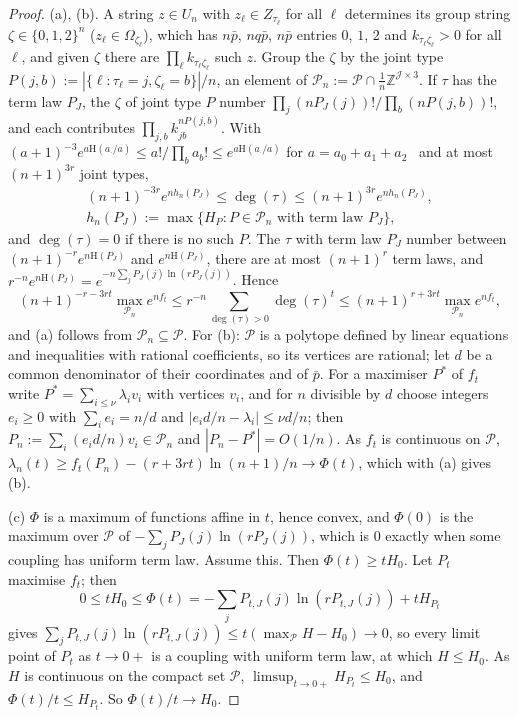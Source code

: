 \documentclass[11pt]{article}
\theoremstyle{definition}
\theoremstyle{remark}
\newcommand{\Z}{\mathbb{Z}}
\newcommand{\Hh}{\mathrm{H}}
\begin{document}
\begin{proof}
(a), (b). A string $z\in U_n$ with $z_\ell\in Z_{\tau_\ell}$ for all $\ell$ determines its group string $\zeta\in\{0,1,2\}^n$ ($z_\ell\in\Omega_{\zeta_\ell}$), which has $n\bar p$, $nq\bar p$, $n\bar p$ entries $0$, $1$, $2$ and $k_{\tau_\ell\zeta_\ell}>0$ for all $\ell$, and given $\zeta$ there are $\prod_\ell k_{\tau_\ell\zeta_\ell}$ such $z$. Group the $\zeta$ by the joint type $P(j,b):=|\{\ell:\tau_\ell=j,\zeta_\ell=b\}|/n$, an element of $\mathcal P_n:=\mathcal P\cap\frac1n\Z^{\mathcal J\times3}$. If $\tau$ has the term law $P_J$, the $\zeta$ of joint type $P$ number $\prod_j(nP_J(j))!/\prod_b(nP(j,b))!$, and each contributes $\prod_{j,b}k_{jb}^{nP(j,b)}$. With $(a+1)^{-3}e^{a\Hh(a_\cdot/a)}\le a!/\prod_ba_b!\le e^{a\Hh(a_\cdot/a)}$ for $a=a_0+a_1+a_2$~\cite[Theorem~11.1.3]{CT06} and at most $(n+1)^{3r}$ joint types,
\begin{gather*}
(n+1)^{-3r}e^{nh_n(P_J)}\le\deg(\tau)\le(n+1)^{3r}e^{nh_n(P_J)},\\
h_n(P_J):=\max\{H_P:P\in\mathcal P_n\text{ with term law }P_J\},
\end{gather*}
and $\deg(\tau)=0$ if there is no such $P$. The $\tau$ with term law $P_J$ number between $(n+1)^{-r}e^{n\Hh(P_J)}$ and $e^{n\Hh(P_J)}$, there are at most $(n+1)^r$ term laws, and $r^{-n}e^{n\Hh(P_J)}=e^{-n\sum_jP_J(j)\ln(rP_J(j))}$. Hence
\[
(n+1)^{-r-3rt}\max_{\mathcal P_n}e^{nf_t}\le r^{-n}\sum_{\deg(\tau)>0}\deg(\tau)^t\le(n+1)^{r+3rt}\max_{\mathcal P_n}e^{nf_t},
\]
and (a) follows from $\mathcal P_n\subseteq\mathcal P$. For (b): $\mathcal P$ is a polytope defined by linear equations and inequalities with rational coefficients, so its vertices are rational; let $d$ be a common denominator of their coordinates and of $\bar p$. For a maximiser $P^*$ of $f_t$ write $P^*=\sum_{i\le\nu}\lambda_iv_i$ with vertices $v_i$, and for $n$ divisible by $d$ choose integers $e_i\ge0$ with $\sum_ie_i=n/d$ and $|e_id/n-\lambda_i|\le\nu d/n$; then $P_n:=\sum_i(e_id/n)v_i\in\mathcal P_n$ and $|P_n-P^*|=O(1/n)$. As $f_t$ is continuous on $\mathcal P$, $\lambda_n(t)\ge f_t(P_n)-(r+3rt)\ln(n+1)/n\to\Phi(t)$, which with (a) gives (b).

(c) $\Phi$ is a maximum of functions affine in $t$, hence convex, and $\Phi(0)$ is the maximum over $\mathcal P$ of $-\sum_jP_J(j)\ln(rP_J(j))$, which is $0$ exactly when some coupling has uniform term law. Assume this. Then $\Phi(t)\ge tH_0$. Let $P_t$ maximise $f_t$; then
\[
0\le tH_0\le\Phi(t)=-\sum_jP_{t,J}(j)\ln(rP_{t,J}(j))+tH_{P_t}
\]
gives $\sum_jP_{t,J}(j)\ln(rP_{t,J}(j))\le t(\max_{\mathcal P}H-H_0)\to0$, so every limit point of $P_t$ as $t\to0+$ is a coupling with uniform term law, at which $H\le H_0$. As $H$ is continuous on the compact set $\mathcal P$, $\limsup_{t\to0+}H_{P_t}\le H_0$, and $\Phi(t)/t\le H_{P_t}$. So $\Phi(t)/t\to H_0$.


\end{proof}
\end{document}
